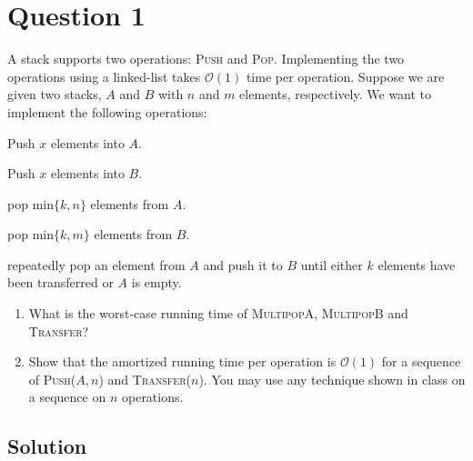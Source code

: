 
\section*{Question 1}

A stack supports two operations: \textsc{Push} and \textsc{Pop}. Implementing the two operations using a linked-list takes $\mathcal{O}(1)$ time per operation. Suppose we are given two stacks, $A$ and $B$ with $n$ and $m$ elements, respectively. We want to implement the following operations:
\begin{description}\itemsep=0pt
\item[\textsc{Push}($A, x$)] Push $x$ elements into $A$.
\item[\textsc{Push}($B, x$)] Push $x$ elements into $B$.
\item[\textsc{MultipopA($k$)}] pop $\text{min}\{k,n\}$ elements from $A$.
\item[\textsc{MultipopB($k$)}] pop $\text{min}\{k,m\}$ elements from $B$.
\item[\textsc{Transfer($k$)}] repeatedly pop an element from $A$ and push it to $B$ until either $k$ elements have been transferred or $A$ is empty.
\end{description}
\begin{enumerate}[label=(\alph*)]
\item What is the worst-case running time of \textsc{MultipopA}, \textsc{MultipopB} and \textsc{Transfer}?
\item Show that the amortized running time per operation is $\mathcal{O}(1)$ for a sequence of \textsc{Push}($A,n$) and \textsc{Transfer}($n$). You may use any technique shown in class on a sequence on $n$ operations.
\end{enumerate}

\subsection*{Solution}

